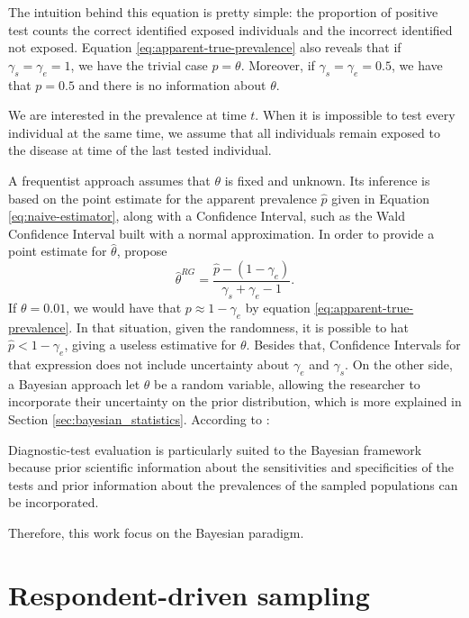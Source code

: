 The intuition behind this equation is pretty simple: the proportion
of positive test counts the correct identified exposed individuals and the
incorrect identified not exposed. Equation \eqref{eq:apparent-true-prevalence}
also reveals that if $\gamma_s = \gamma_e = 1$, we have the trivial 
case $p = \theta$. Moreover, if $\gamma_s = \gamma_e = 0.5$, we have that
$p = 0.5$ and there is no information about $\theta$. 

\begin{remark}
  We are interested in the prevalence at time $t$. When it is 
  impossible to test every individual at the same time, we assume that all
  individuals remain exposed to the disease at time of the last tested individual. 
\end{remark}

A frequentist approach assumes that $\theta$ is fixed and unknown. Its
inference is based on the point 
estimate for the apparent prevalence $\hat{p}$ given in Equation
\eqref{eq:naive-estimator}, along with a Confidence Interval, such as the Wald
Confidence Interval built with a normal approximation. In order to provide a 
point estimate for $\hat{\theta}$, \textcite[p. 73]{rogan1978estimating} propose
$$\hat{\theta}^{RG} = \frac{\hat{p} - (1-\gamma_e)}{\gamma_s + \gamma_e -
1}.$$ 
If $\theta = 0.01$, we would have that $p \approx 1 - \gamma_e$ by 
equation \eqref{eq:apparent-true-prevalence}. In that situation, given the 
randomness, it is possible to hat $\hat{p} < 1 - \gamma_e$, giving a 
useless estimative for $\theta$. Besides that, Confidence Intervals for that 
expression does not include uncertainty about $\gamma_e$ and $\gamma_s$. On the other side, a Bayesian approach let $\theta$ be a random variable,
allowing the researcher to incorporate their uncertainty on the prior
distribution, which is more explained in Section
\ref{sec:bayesian_statistics}. According to \textcite[p.
1]{branscum2005estimation}:
\begin{citacao}
  Diagnostic-test evaluation is particularly suited to the
  Bayesian framework because prior scientific information about the
  sensitivities and specificities of the tests and prior information about the prevalences of the sampled
  populations can be incorporated.
\end{citacao}

Therefore, this work focus on the Bayesian paradigm. 

\section{Respondent-driven sampling}
\label{sec:respodent_driven_sampling}

